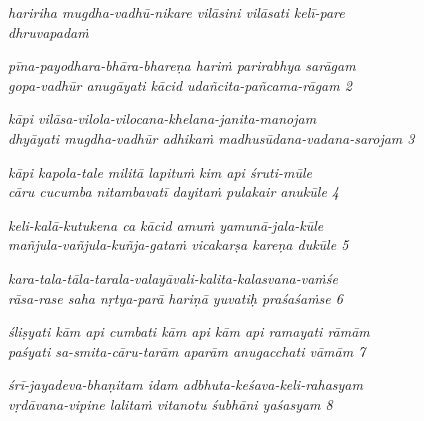 \begin{myquote}
\textit{haririha mugdha-vadhū-nikare vilāsini vilāsati kelī-pare }\\\textit{dhruvapadaṁ }
\end{myquote}

\begin{myquote}
\textit{pīna-payodhara-bhāra-bhareṇa hariṁ parirabhya sarāgam }\\\textit{gopa-vadhūr anugāyati kācid udañcita-pañcama-rāgam  2 }
\end{myquote}

\begin{myquote}
\textit{kāpi vilāsa-vilola-vilocana-khelana-janita-manojam }\\\textit{dhyāyati mugdha-vadhūr adhikaṁ madhusūdana-vadana-sarojam  3 }
\end{myquote}

\begin{myquote}
\textit{kāpi kapola-tale militā lapituṁ kim api śruti-mūle } \\\textit{cāru cucumba nitambavatī dayitaṁ pulakair anukūle  4 }
\end{myquote}

\begin{myquote}
\textit{keli-kalā-kutukena ca kācid amuṁ yamunā-jala-kūle } \\\textit{mañjula-vañjula-kuñja-gataṁ vicakarṣa kareṇa dukūle  5 }
\end{myquote}

\begin{myquote}
\textit{kara-tala-tāla-tarala-valayāvali-kalita-kalasvana-vaṁśe } \\\textit{rāsa-rase saha nṛtya-parā hariṇā yuvatiḥ praśaśaṁse  6 }
\end{myquote}

\begin{myquote}
\textit{śliṣyati kām api cumbati kām api kām api ramayati rāmām } \\\textit{paśyati sa-smita-cāru-tarām aparām anugacchati vāmām  7 }
\end{myquote}

\begin{myquote}
\textit{śrī-jayadeva-bhaṇitam idam adbhuta-keśava-keli-rahasyam } \\\textit{vṛdāvana-vipine lalitaṁ vitanotu śubhāni yaśasyam  8 }
\end{myquote}


